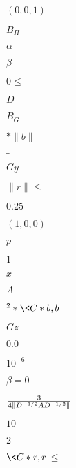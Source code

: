 \documentclass{article}
\begin{document}
$(0,0,1)$


\pagebreak


$B_\Pi$


\pagebreak


$\alpha$


\pagebreak


$\beta$


\pagebreak


$0 \le$


\pagebreak


$D$


\pagebreak


$B_G$


\pagebreak


$\ast \|b\|$


\pagebreak


$\_$


\pagebreak


$Gy$


\pagebreak


$\|r\| \leq$


\pagebreak


$0.25$


\pagebreak


$(1,0,0)$


\pagebreak


$p$


\pagebreak


$1$


\pagebreak


$x$


\pagebreak


$A$


\pagebreak


$^{2} \ast \<C*b, b\>$


\pagebreak


$Gz$


\pagebreak


$0.0$


\pagebreak


$10^{-6}$


\pagebreak


$\beta=0$


\pagebreak


$3 \over {4\|D^{-1/2}AD^{-1/2}\|}$


\pagebreak


$10$


\pagebreak


$2$


\pagebreak


$ \<C*r,r\> \leq$
\end{document}
